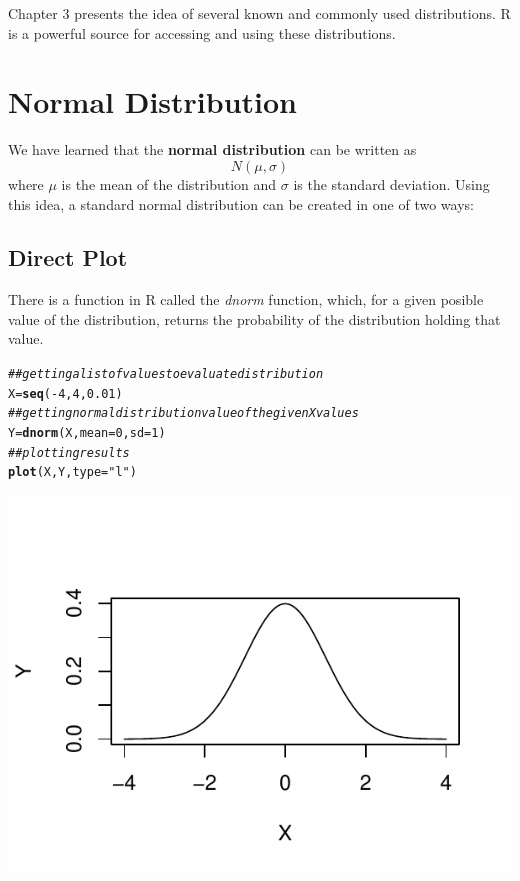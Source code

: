 \documentclass{report}\usepackage[]{graphicx}\usepackage[]{color}
\makeatletter
\def\maxwidth{ %
  \ifdim\Gin@nat@width>\linewidth
    \linewidth
  \else
    \Gin@nat@width
  \fi
}
\newcommand{\hlnum}[1]{\textcolor[rgb]{0.686,0.059,0.569}{#1}}%
\newcommand{\hlstr}[1]{\textcolor[rgb]{0.192,0.494,0.8}{#1}}%
\newcommand{\hlcom}[1]{\textcolor[rgb]{0.678,0.584,0.686}{\textit{#1}}}%
\newcommand{\hlopt}[1]{\textcolor[rgb]{0,0,0}{#1}}%
\newcommand{\hlstd}[1]{\textcolor[rgb]{0.345,0.345,0.345}{#1}}%
\newcommand{\hlkwb}[1]{\textcolor[rgb]{0.69,0.353,0.396}{#1}}%
\newcommand{\hlkwc}[1]{\textcolor[rgb]{0.333,0.667,0.333}{#1}}%
\newcommand{\hlkwd}[1]{\textcolor[rgb]{0.737,0.353,0.396}{\textbf{#1}}}%
\newenvironment{kframe}{%
 \def\at@end@of@kframe{}%
 \ifinner\ifhmode%
  \def\at@end@of@kframe{\end{minipage}}%
  \begin{minipage}{\columnwidth}%
 \fi\fi%
 \def\FrameCommand##1{\hskip\@totalleftmargin \hskip-\fboxsep
 \colorbox{shadecolor}{##1}\hskip-\fboxsep
     \hskip-\linewidth \hskip-\@totalleftmargin \hskip\columnwidth}%
 \MakeFramed {\advance\hsize-\width
   \@totalleftmargin\z@ \linewidth\hsize
   \@setminipage}}%
 {\par\unskip\endMakeFramed%
 \at@end@of@kframe}
\newenvironment{knitrout}{}{} %
\makeatother
\begin{document}
\vspace{0.5cm} 

Chapter 3 presents the idea of several known and commonly used distributions.  R is a powerful source for accessing and using these distributions.

\section{Normal Distribution}
We have learned that the \textbf{normal distribution} can be written as 
\[ N(\mu, \sigma) \]
where $\mu$ is the mean of the distribution and $\sigma$ is the standard deviation.  Using this idea, a standard normal distribution can be created in one of two ways: 

\subsection{Direct Plot}
There is a function in R called the \textit{dnorm} function, which, for a given posible value of the distribution, returns the probability of the distribution holding that value.  
\begin{knitrout}
\color{fgcolor}\begin{kframe}
\begin{alltt}
\hlcom{## getting a list of values to evaluate distribution}
\hlstd{X} \hlkwb{=} \hlkwd{seq}\hlstd{(}\hlopt{-}\hlnum{4}\hlstd{,} \hlnum{4}\hlstd{,} \hlnum{0.01}\hlstd{)}
\hlcom{## getting normal distribution value of the given X values }
\hlstd{Y} \hlkwb{=} \hlkwd{dnorm}\hlstd{(X,} \hlkwc{mean} \hlstd{=} \hlnum{0}\hlstd{,} \hlkwc{sd} \hlstd{=} \hlnum{1}\hlstd{)}
\hlcom{## plotting results }
\hlkwd{plot}\hlstd{(X,Y,} \hlkwc{type} \hlstd{=} \hlstr{"l"}\hlstd{)}
\end{alltt}
\end{kframe}

{\centering \includegraphics[width=\maxwidth]{figure/unnamed-chunk-47-1} 

}



\end{knitrout}
\end{document}
